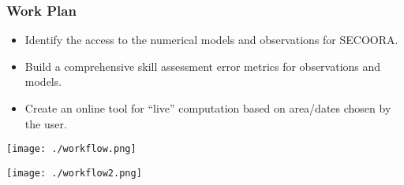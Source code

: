 \documentclass[14pt,xcolor=dvipsnames]{beamer}
\title[SECOORA PI MEETING]{}
\subtitle{Development of an on-line model skill assessment tool}
\author[Filipe Fernandes]{Filipe P. A. Fernandes}
\institute[SECOORA]{Centro Universitário Monte Serrat}
\begin{document}
\begin{frame}[plain]
  \titlepage
\end{frame}


\begin{frame}
\frametitle{Work Plan}
  \begin{itemize}
  \item Identify the access to the numerical models and observations for SECOORA.
  \item Build a comprehensive skill assessment error metrics for observations
        and models.
  \item Create an online tool for ``live'' computation based on area/dates
        chosen by the user.
  \end{itemize}
\end{frame}

\begin{frame}
  \begin{center}
    \texttt{[image: ./workflow.png]}
  \end{center}
\end{frame}


\begin{frame}
  \begin{center}
    \texttt{[image: ./workflow2.png]}
  \end{center}
\end{frame}
\end{document}
